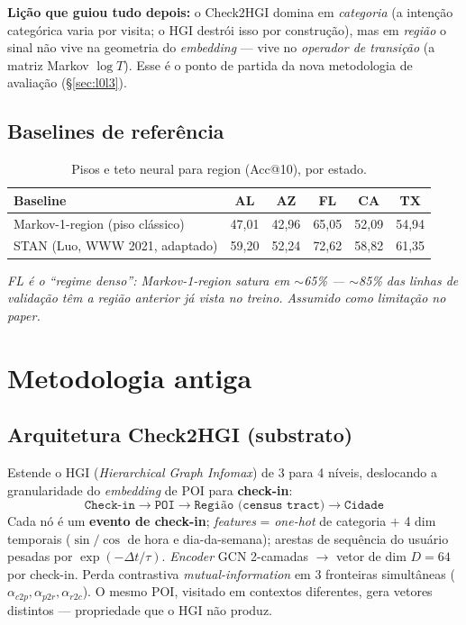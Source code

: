 \documentclass[11pt,a4paper]{article}
\newcommand{\note}[1]{\textcolor{black!55}{\textit{#1}}}
\begin{document}
\noindent \textbf{Lição que guiou tudo depois:} o Check2HGI domina em \emph{categoria} (a intenção
categórica varia por visita; o HGI destrói isso por construção), mas em \emph{região} o sinal não
vive na geometria do \textit{embedding} --- vive no \emph{operador de transição} (a matriz Markov
$\log T$). Esse é o ponto de partida da nova metodologia de avaliação (\S\ref{sec:l0l3}).

\subsection{Baselines de referência}

\begin{table}[H]
\centering
\footnotesize
\caption{Pisos e teto neural para region (Acc@10), por estado.}
\begin{tabular}{lccccc}
\toprule
\textbf{Baseline} & \textbf{AL} & \textbf{AZ} & \textbf{FL} & \textbf{CA} & \textbf{TX} \\
\midrule
Markov-1-region (piso clássico) & 47,01 & 42,96 & 65,05 & 52,09 & 54,94 \\
STAN (Luo, WWW 2021, adaptado) & 59,20 & 52,24 & 72,62 & 58,82 & 61,35 \\
\bottomrule
\end{tabular}
\end{table}

\noindent\note{FL é o ``regime denso'': Markov-1-region satura em $\sim$65\% --- $\sim$85\% das
linhas de validação têm a região anterior já vista no treino. Assumido como limitação no paper.}

\section{Metodologia antiga}\label{sec:antiga}

\subsection{Arquitetura Check2HGI (substrato)}

Estende o HGI (\textit{Hierarchical Graph Infomax}) de 3 para 4 níveis, deslocando a granularidade
do \textit{embedding} de POI para \textbf{check-in}:
\[
\texttt{Check-in} \to \texttt{POI} \to \texttt{Região (census tract)} \to \texttt{Cidade}
\]
Cada nó é um \textbf{evento de check-in}; \textit{features} = \textit{one-hot} de categoria $+$ 4 dim
temporais ($\sin/\cos$ de hora e dia-da-semana); arestas de sequência do usuário pesadas por
$\exp(-\Delta t/\tau)$. \textit{Encoder} GCN 2-camadas $\to$ vetor de dim $D=64$ por check-in. Perda
contrastiva \textit{mutual-information} em 3 fronteiras simultâneas
($\alpha_{c2p},\alpha_{p2r},\alpha_{r2c}$). O mesmo POI, visitado em contextos diferentes, gera vetores
distintos --- propriedade que o HGI não produz.
\end{document}
